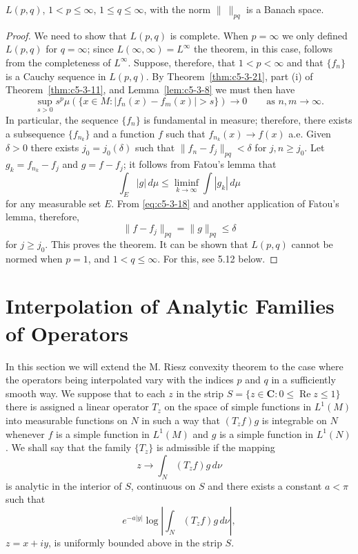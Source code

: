 \begin{theorem}\label{thm:c5-3-22}
$L(p, q)$, $1 < p \leq \infty$, $1 \leq q \leq \infty$, with the norm
$\|\ \|_{pq}$ is a Banach space.
\end{theorem}

\begin{proof}
We need to show that $L(p, q)$ is complete. When $p = \infty$ we only defined
$L(p, q)$ for $q = \infty$; since $L(\infty, \infty) = L^{\infty}$ the theorem,
in this case, follows from the completeness of $L^{\infty}$. Suppose,
therefore, that $1 < p < \infty$ and that $\{f_{n}\}$ is a Cauchy sequence in
$L(p, q)$. By Theorem~\ref{thm:c5-3-21}, part (i) of
Theorem~\ref{thm:c5-3-11}, and Lemma~\ref{lem:c5-3-8} we must then have
\[
\sup_{s>0}s^{p}\mu(\{x \in M : |f_{n}(x)-f_{m}(x)| > s\}) \to 0
\qquad\text{as } n, m \to \infty.
\]
In particular, the sequence $\{f_{n}\}$ is fundamental in measure; therefore,
there exists a subsequence $\{f_{n_{k}}\}$ and a function $f$ such that
$f_{n_{k}}(x) \to f(x)$ a.e. Given $\delta > 0$ there exists
$j_{0} = j_{0}(\delta)$ such that $\|f_{n} - f_{j}\|_{pq} < \delta$ for
$j, n \geq j_{0}$. Let $g_{k} = f_{n_{k}} - f_{j}$ and $g = f - f_{j}$; it
follows from Fatou's lemma that
\[
\int_{E}|g|\,d\mu\leq\liminf_{k \to \infty}\int|g_{k}|\,d\mu
\]
for any measurable set $E$. From \eqref{eq:c5-3-18} and another application of
Fatou's lemma, therefore,
\[
\|f-f_{j}\|_{pq}=\|g\|_{pq}\leq\delta
\]
for $j \geq j_{0}$. This proves the theorem. It can be shown that $L(p, q)$
cannot be normed when $p = 1$, and $1 < q \leq \infty$. For this, see 5.12
below.
\end{proof}

\section{Interpolation of Analytic Families of Operators}

In this section we will extend the M. Riesz convexity theorem to the case
where the operators being interpolated vary with the indices $p$ and $q$ in a
sufficiently smooth way. We suppose that to each $z$ in the strip
$S = \{z \in \mathbf{C} : 0 \leq \operatorname{Re} z \leq 1\}$ there is
assigned a linear operator $T_{z}$ on the space of simple functions in
$L^{1}(M)$ into measurable functions on $N$ in such a way that $(T_{z}f)g$ is
integrable on $N$ whenever $f$ is a simple function in $L^{1}(M)$ and $g$ is a
simple function in $L^{1}(N)$. We shall say that the family $\{T_{z}\}$ is
admissible if the mapping
\[
z\to\int_{N}(T_{z}f)g\,d\nu
\]
is analytic in the interior of $S$, continuous on $S$ and there exists a
constant $a < \pi$ such that
\[
e^{-a|y|}\log\left|\int_{N}(T_{z}f)g\,d\nu\right|,
\]
$z = x + iy$, is uniformly bounded above in the strip $S$.

